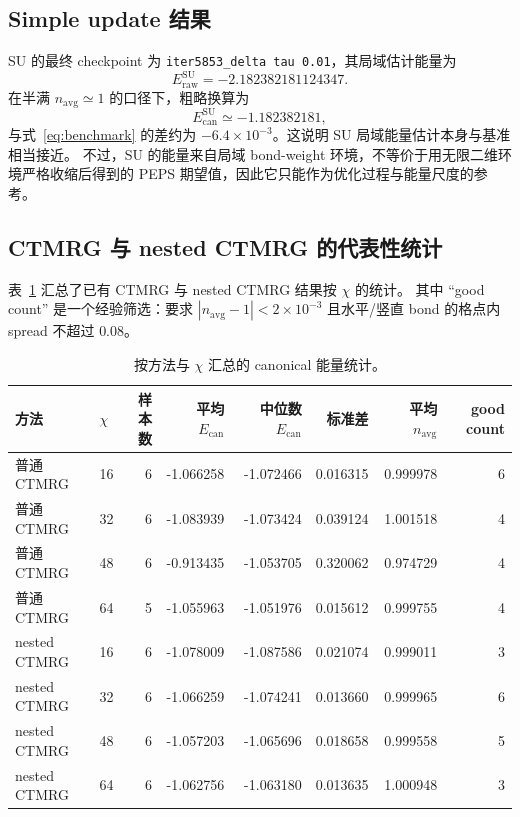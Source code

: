 \documentclass[11pt,a4paper]{ctexart}
\newcommand{\ctmrg}{CTMRG}
\newcommand{\peps}{PEPS}
\newcommand{\Eraw}{E_{\mathrm{raw}}}
\newcommand{\Ecan}{E_{\mathrm{can}}}
\newcommand{\nb}{n_{\mathrm{avg}}}
\begin{document}
\subsection{Simple update 结果}

SU 的最终 checkpoint 为 \texttt{iter5853\_delta tau 0.01}，其局域估计能量为
\begin{equation}
  \Eraw^{\mathrm{SU}} = -2.182382181124347 .
\end{equation}
在半满 $\nb\simeq 1$ 的口径下，粗略换算为
\begin{equation}
  \Ecan^{\mathrm{SU}}\simeq -1.182382181,
\end{equation}
与式~\eqref{eq:benchmark} 的差约为 $-6.4\times10^{-3}$。这说明 SU 局域能量估计本身与基准相当接近。
不过，SU 的能量来自局域 bond-weight 环境，不等价于用无限二维环境严格收缩后得到的 \peps{} 期望值，因此它只能作为优化过程与能量尺度的参考。

\subsection{\ctmrg{} 与 nested \ctmrg{} 的代表性统计}

表~\ref{tab:summary} 汇总了已有 \ctmrg{} 与 nested \ctmrg{} 结果按 $\chi$ 的统计。
其中 ``good count'' 是一个经验筛选：要求 $|\nb-1|<2\times10^{-3}$ 且水平/竖直 bond 的格点内 spread 不超过 $0.08$。

\begin{table}[htbp]
  \centering
  \caption{按方法与 $\chi$ 汇总的 canonical 能量统计。}
  \label{tab:summary}
  \begin{tabular}{llrrrrrr}
    \toprule
    方法 & $\chi$ & 样本数 & 平均 $\Ecan$ & 中位数 $\Ecan$ & 标准差 & 平均 $\nb$ & good count\\
    \midrule
    普通 \ctmrg{} & 16 & 6 & -1.066258 & -1.072466 & 0.016315 & 0.999978 & 6\\
    普通 \ctmrg{} & 32 & 6 & -1.083939 & -1.073424 & 0.039124 & 1.001518 & 4\\
    普通 \ctmrg{} & 48 & 6 & -0.913435 & -1.053705 & 0.320062 & 0.974729 & 4\\
    普通 \ctmrg{} & 64 & 5 & -1.055963 & -1.051976 & 0.015612 & 0.999755 & 4\\
    nested \ctmrg{} & 16 & 6 & -1.078009 & -1.087586 & 0.021074 & 0.999011 & 3\\
    nested \ctmrg{} & 32 & 6 & -1.066259 & -1.074241 & 0.013660 & 0.999965 & 6\\
    nested \ctmrg{} & 48 & 6 & -1.057203 & -1.065696 & 0.018658 & 0.999558 & 5\\
    nested \ctmrg{} & 64 & 6 & -1.062756 & -1.063180 & 0.013635 & 1.000948 & 3\\
    \bottomrule
  \end{tabular}
\end{table}
\end{document}
